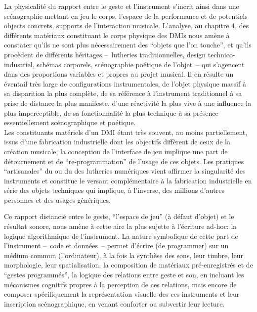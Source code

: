 
\noindent La physicalité du rapport entre le geste et l'instrument s'incrit ainsi dans une scénographie mettant en jeu le corps, l'espace de la performance et de potentiels objects concrets, supports de l'interaction musicale. L'analyse, au chapitre 4, des différents matériaux constituant le corps physique des \glspl{DMI} nous amène à constater qu'ils ne sont plus nécessairement des ``objets que l'on touche'', et qu'ils procèdent de différents héritages --~lutheries traditionnelles, design technico-industriel, schémas corporels, scénographie poétique de l'objet~-- qui s'agencent dans des proportions variables et propres au projet musical. Il en résulte un éventail très large de configurations instrumentales, de l'objet physique massif à sa disparition la plus complète, de sa référence à l'instrument traditionnel à sa prise de distance la plus manifeste, d'une réactivité la plus vive à une influence la plus imperceptible, de sa fonctionnalité la plus technique à sa présence essentiellement scénographique et poétique.\\
\indent Les constituants matériels d'un \gls{DMI} étant très souvent, au moins partiellement, issus d'une fabrication industrielle dont les objectifs diffèrent de ceux de la création musicale, la conception de l'interface de jeu implique une part de détournement et de ``re-programmation'' de l'usage de ces objets. Les pratiques ``artisanales'' du  ou du  des lutheries numériques vient affirmer la singularité des instruments et constitue le versant complémentaire à la fabrication industrielle en série des objets techniques qui implique, à l'inverse, des millions d'autres personnes et des usages génériques.





Ce rapport distancié entre le geste, ``l'espace de jeu'' (à défaut d'objet) et le résultat sonore, nous amène à cette aire la plus sujette à l'écriture ad-hoc: la logique algorithmique de l'instrument. La nature symbolique de cette part de l'instrument --~code et données~--  permet d'écrire (de programmer) sur un médium commun (l'ordinateur), à la fois la synthèse des sons, leur timbre, leur morphologie, leur spatialisation, la composition de matériaux pré-enregistrés et de ``gestes programmés'', la logique des relations entre geste et son, en incluant les mécanismes cognitifs propres à la perception de ces relations, mais encore de composer spécifiquement la représentation visuelle des ces instruments et leur inscription scénographique, en venant conforter ou subvertir leur lecture.

